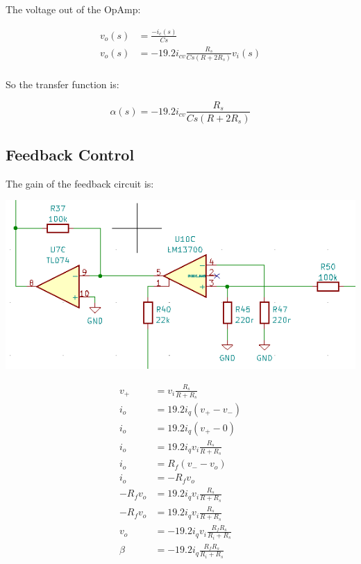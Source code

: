 \documentclass{article}
\begin{document}
The voltage out of the OpAmp:

\begin{equation*}
\begin{split}
  v_o(s) & = \frac{-i_c(s)}{Cs} \\
  v_o(s) & = -19.2i_{cv}\frac{R_s}{Cs(R + 2R_s)}v_i(s) \\
\end{split}
\end{equation*}

So the transfer function is:

\begin{equation}
  \alpha(s) = -19.2i_{cv}\frac{R_s}{Cs(R + 2R_s)}
\end{equation}

\subsection{Feedback Control}

The gain of the feedback circuit is:

\includegraphics[width=\linewidth]{images/inverting-feedback-amp.png}

\begin{equation*}
\begin{split}
  v_+ & = v_i\frac{R_s}{R + R_s} \\
  i_o & = 19.2i_{q}(v_+ - v_-) \\
  i_o & = 19.2i_{q}(v_+ - 0) \\
  i_o & = 19.2i_{q}v_i\frac{R_s}{R + R_s} \\
  i_o & = R_f(v_- - v_o) \\
  i_o & = -R_fv_o \\
  -R_fv_o & = 19.2i_{q}v_i\frac{R_s}{R + R_s} \\
  -R_fv_o & = 19.2i_{q}v_i\frac{R_s}{R + R_s} \\
  v_o & = -19.2i_{q}v_i\frac{R_fR_s}{R_i + R_s} \\
  \beta & = -19.2i_{q}\frac{R_fR_s}{R_i + R_s} \\
\end{split}
\end{equation*}
\end{document}
